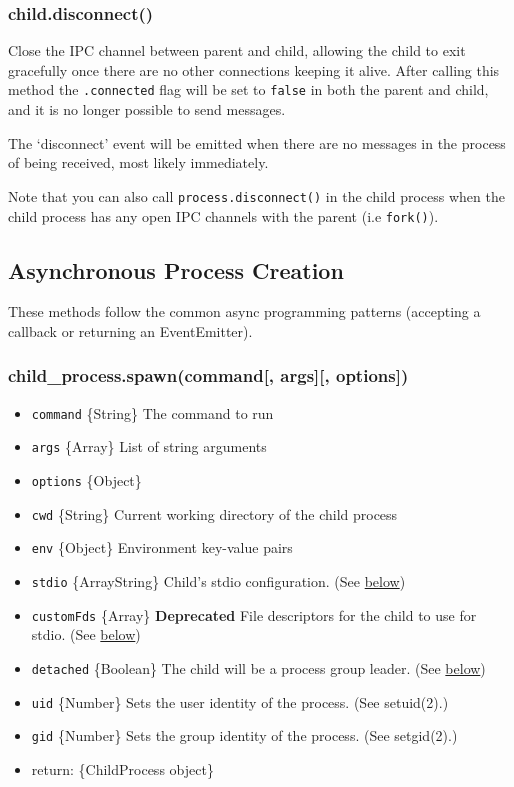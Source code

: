 \subsubsection{child.disconnect()}\label{child.disconnect}

Close the IPC channel between parent and child, allowing the child to
exit gracefully once there are no other connections keeping it alive.
After calling this method the \texttt{.connected} flag will be set to
\texttt{false} in both the parent and child, and it is no longer
possible to send messages.

The `disconnect' event will be emitted when there are no messages in the
process of being received, most likely immediately.

Note that you can also call \texttt{process.disconnect()} in the child
process when the child process has any open IPC channels with the parent
(i.e \texttt{fork()}).

\subsection{Asynchronous Process
Creation}\label{asynchronous-process-creation}

These methods follow the common async programming patterns (accepting a
callback or returning an EventEmitter).

\subsubsection{child\_process.spawn(command{[}, args{]}{[},
options{]})}\label{childux5fprocess.spawncommand-args-options}

\begin{itemize}
\itemsep1pt\parskip0pt
\item
  \texttt{command} \{String\} The command to run
\item
  \texttt{args} \{Array\} List of string arguments
\item
  \texttt{options} \{Object\}
\item
  \texttt{cwd} \{String\} Current working directory of the child process
\item
  \texttt{env} \{Object\} Environment key-value pairs
\item
  \texttt{stdio} \{Array\textbar{}String\} Child's stdio configuration.
  (See \hyperref[childux5fprocessux5foptionsux5fstdio]{below})
\item
  \texttt{customFds} \{Array\} \textbf{Deprecated} File descriptors for
  the child to use for stdio. (See
  \hyperref[childux5fprocessux5foptionsux5fcustomFds]{below})
\item
  \texttt{detached} \{Boolean\} The child will be a process group
  leader. (See
  \hyperref[childux5fprocessux5foptionsux5fdetached]{below})
\item
  \texttt{uid} \{Number\} Sets the user identity of the process. (See
  setuid(2).)
\item
  \texttt{gid} \{Number\} Sets the group identity of the process. (See
  setgid(2).)
\item
  return: \{ChildProcess object\}
\end{itemize}

